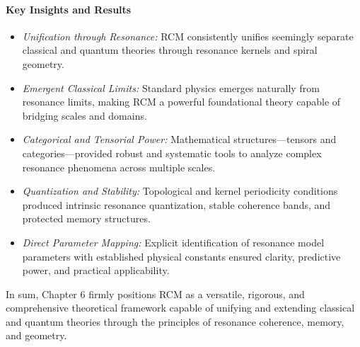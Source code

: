 \paragraph{Key Insights and Results}
\begin{itemize}
  \item \emph{Unification through Resonance:} RCM consistently unifies seemingly separate classical and quantum theories through resonance kernels and spiral geometry.
  \item \emph{Emergent Classical Limits:} Standard physics emerges naturally from resonance limits, making RCM a powerful foundational theory capable of bridging scales and domains.
  \item \emph{Categorical and Tensorial Power:} Mathematical structures—tensors and categories—provided robust and systematic tools to analyze complex resonance phenomena across multiple scales.
  \item \emph{Quantization and Stability:} Topological and kernel periodicity conditions produced intrinsic resonance quantization, stable coherence bands, and protected memory structures.
  \item \emph{Direct Parameter Mapping:} Explicit identification of resonance model parameters with established physical constants ensured clarity, predictive power, and practical applicability.
\end{itemize}

In sum, Chapter 6 firmly positions RCM as a versatile, rigorous, and comprehensive theoretical framework capable of unifying and extending classical and quantum theories through the principles of resonance coherence, memory, and geometry.


